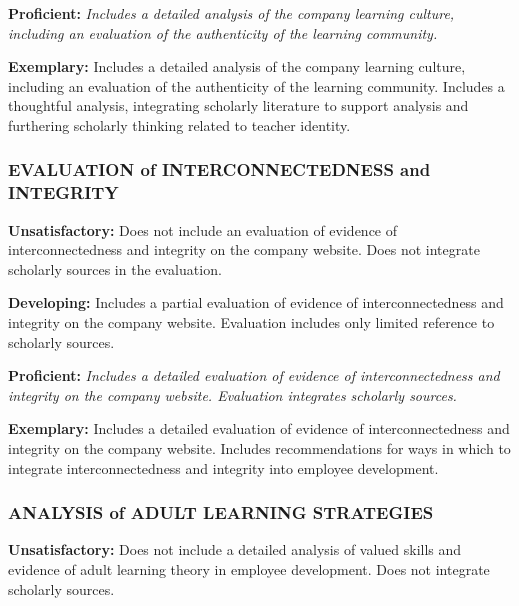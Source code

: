 \documentclass[
]{book}
\begin{document}
\textbf{Proficient:} \emph{Includes a detailed analysis of the company learning culture, including an
evaluation of the authenticity of the learning community.}

\textbf{Exemplary:} Includes a detailed analysis of the company learning culture, including an
evaluation of the authenticity of the learning community. Includes a thoughtful
analysis, integrating scholarly literature to support analysis and furthering
scholarly thinking related to teacher identity.

\hypertarget{evaluation-of-interconnectedness-and-integrity}{%
\subsubsection*{EVALUATION of INTERCONNECTEDNESS and INTEGRITY}\label{evaluation-of-interconnectedness-and-integrity}}

\textbf{Unsatisfactory:} Does not include an evaluation of evidence of interconnectedness and integrity
on the company website. Does not integrate scholarly sources in the evaluation.

\textbf{Developing:} Includes a partial evaluation of evidence of interconnectedness and integrity on
the company website. Evaluation includes only limited reference to scholarly
sources.

\textbf{Proficient:} \emph{Includes a detailed evaluation of evidence of interconnectedness and integrity
on the company website. Evaluation integrates scholarly sources.}

\textbf{Exemplary:} Includes a detailed evaluation of evidence of interconnectedness and integrity
on the company website. Includes recommendations for ways in which to integrate
interconnectedness and integrity into employee development.

\hypertarget{analysis-of-adult-learning-strategies}{%
\subsubsection*{ANALYSIS of ADULT LEARNING STRATEGIES}\label{analysis-of-adult-learning-strategies}}

\textbf{Unsatisfactory:} Does not include a detailed analysis of valued skills and evidence of adult
learning theory in employee development. Does not integrate scholarly sources.
\end{document}
